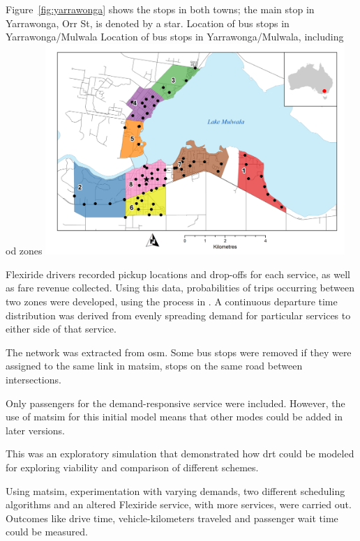 Figure~\ref{fig:yarrawonga} shows the stops in both towns; the main stop in Yarrawonga, Orr St, is denoted by a star.
%
\createfigure%
{Location of bus stops in Yarrawonga/Mulwala}%
{Location of bus stops in Yarrawonga/Mulwala, including \gls{od} zones}%
{\label{fig:yarrawonga}}%
{\includegraphics[width=0.85\textwidth, angle=0]{./using/figures/yarrawonga_high.png}}%
{}
%

Flexiride drivers recorded pickup locations and drop-offs for each service,
as well as fare revenue collected. Using this data, probabilities of trips
occurring between two zones were developed, using the process in
\citet[][]{Deflorio_ITSIET_2011}. A continuous departure time distribution was
derived from evenly spreading demand for particular services to either side
of that service. 


The network was extracted from \gls{osm}. Some bus stops were removed if they were assigned to the same link in \gls{matsim}, \eg stops on the same road between intersections.

Only passengers for the demand-responsive service were included. However, the use of \gls{matsim} for this initial model means that other modes could be added in later versions.


This was an exploratory simulation that demonstrated how \gls{drt} could be modeled for exploring viability and comparison of different schemes.

Using \gls{matsim}, experimentation with varying demands, two different scheduling
algorithms and an altered Flexiride service, with more services, were
carried out. Outcomes like drive time, vehicle-kilometers traveled and
passenger wait time could be measured.

